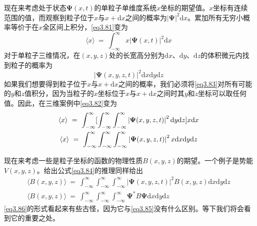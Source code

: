 \documentclass[12pt,a4paper,openany]{ctexbook}
\begin{document}
\begin{flushleft}
现在来考虑处于状态$\bm{\Psi}(x,t)$的单粒子单维度系统$x$坐标的期望值。$x$坐标有连续范围的值，而观察到粒子位于$x$与$x+\mathrm{d}x$之间的概率为$\left|\bm{\Psi}\right|^2\mathrm{d}x$。累加所有无穷小概率等价于在$x$全区间上积分，\eqref{eq3.81}变为
\begin{equation}
    \langle x\rangle\ =\ \int_{-\infty}^{\infty}x\left|\bm{\Psi}(x,t)\right|^2\mathrm{d}x \label{eq3.82}
\end{equation}
对于单粒子三维情况，在$(x,y,z)$处的长宽高分别为$\mathrm{d}x$、$\mathrm{d}y$、$\mathrm{d}z$的体积微元内找到粒子的概率为
\begin{equation}
    \left|\bm{\Psi}(x,y,z,t)\right|^2\mathrm{d}x\mathrm{d}y\mathrm{d}z \label{eq3.83}
\end{equation}
如果我们想要得到粒子位于$x$与$x+\mathrm{d}x$之间的概率，我们必须将\eqref{eq3.83}对所有可能的$y$和$z$值积分，因为当粒子的$x$坐标位于$x$与$x+\mathrm{d}x$之间时其$y$和$z$坐标可以取任何值。因此，在三维案例中\eqref{eq3.82}变为
\begin{gather}
    \langle x\rangle\ =\ \int_{-\infty}^{\infty}[\int_{-\infty}^{\infty}\int_{-\infty}^{\infty}\left|\bm{\Psi}(x,y,z,t)\right|^2\mathrm{d}y\mathrm{d}z]x\mathrm{d}x \notag \\
    \langle x\rangle\ =\ \int_{-\infty}^{\infty}\int_{-\infty}^{\infty}\int_{-\infty}^{\infty}\left|\bm{\Psi}(x,y,z,t)\right|^2x\mathrm{d}x\mathrm{d}y\mathrm{d}z \label{eq3.84}
\end{gather}

现在来考虑一些是粒子坐标的函数的物理性质$B(x,y,z)$的期望。一个例子是势能$V(x,y,z)$。给出公式\eqref{eq3.84}的推理同样给出
\begin{gather}
    \langle B(x,y,z)\rangle\ =\ \int_{-\infty}^{\infty}\int_{-\infty}^{\infty}\int_{-\infty}^{\infty}\left|\bm{\Psi}(x,y,z,t)\right|^2B(x,y,z)\mathrm{d}x\mathrm{d}y\mathrm{d}z \label{eq3.85} \\
    \langle B(x,y,z)\rangle\ =\ \int_{-\infty}^{\infty}\int_{-\infty}^{\infty}\int_{-\infty}^{\infty}\bm{\Psi}^*B\bm{\Psi}\mathrm{d}x\mathrm{d}y\mathrm{d}z \label{eq3.86}
\end{gather}
\eqref{eq3.86}的形式看起来有些古怪，因为它与\eqref{eq3.85}没有什么区别。等下我们将会看到它的重要之处。


\end{flushleft}
\end{document}
